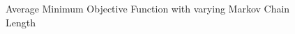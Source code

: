 \documentclass[12pt]{article}
\begin{document}
\begin{enumerate}
\begin{enumerate}
\begin{itemize}
\begin{itemize}
\begin{figure}[H]
		\caption{Average Minimum Objective Function with varying Markov Chain Length}
		\label{fig9}
		\end{figure}
		\end{itemize} 
		\pagebreak
		
		\end{itemize}
	\end{enumerate}
\end{enumerate}
\end{document}
